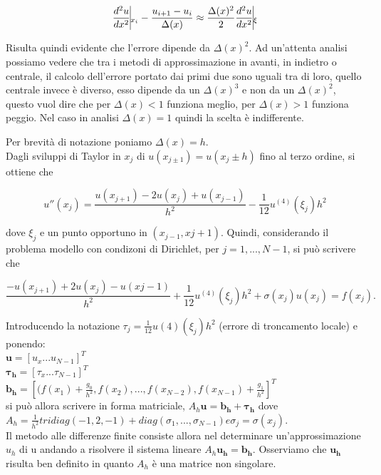 $$
\frac{d^2u}{dx^2}\vline_{x_i}-\frac{u_{i+1}-u_i}{\Delta(x)}\approx \frac{\Delta(x)^2}{2} \frac{d^2u}{dx^2}\vline_\xi
$$

Risulta quindi evidente che l'errore dipende da $\Delta(x)^2$. 
Ad un'attenta analisi possiamo vedere che tra i metodi di approssimazione in avanti, in indietro o centrale, il calcolo dell'errore portato dai primi due sono uguali tra di loro, quello centrale invece è diverso, esso dipende da un $\Delta(x)^3$ e non da un $\Delta(x)^2$, questo vuol dire che per $\Delta(x)<1$ funziona meglio, per $\Delta(x)>1$ funziona peggio. Nel caso in analisi $\Delta(x)=1$ quindi la scelta è indifferente.

Per brevità di notazione poniamo $\Delta(x)=h$.\\
Dagli sviluppi di Taylor in $x_j$ di
$u(x_{j \pm 1}) = u(x_j \pm h)$ fino al terzo ordine, si ottiene che

$$
u''(x_j) =\frac{u(x_{j+1}) - 2u(x_j) + u(x_{j-1})}{h^2} -\frac{1}{12} u^{(4)}(\xi_j)h^2
$$

dove $\xi_j$ e un punto opportuno in $(x_{j-1} , x{j+1})$. Quindi, considerando il problema modello con condizoni di Dirichlet, per $j = 1,...,N-1$, si può scrivere che

$$
\frac{-u(x_{j+1}) + 2u(x_j) -u(x{j-1})}{h^2}
 + \frac{1}{12} u^{(4)}(\xi_j)h^2 + \sigma(x_j)u(x_j) = f(x_j) .
$$

Introducendo la notazione $\tau_{j}=\frac{1}{12} u(4)(\xi_j)h^2$ (errore di troncamento locale) e ponendo:\\

$\boldsymbol{u}=[u_x...u_{N-1}]^T$\\
$\boldsymbol{\tau_h}=[\tau_x...\tau_{N-1}]^T$\\
$\boldsymbol{b_h}=[(f(x_1) + \frac{g_0}{h^2},f(x_2),...,f(x_{N-2}),f(x_{N-1}) + \frac{g_1}{h^2}]^T$\\

si può allora scrivere in forma matriciale,
$A_h\boldsymbol{u} = \boldsymbol{b_h} + \boldsymbol{\tau_h}$
dove $A_h = \frac{1}{h^2}
 tridiag(-1,2,-1) + diag(\sigma_1, ... ,\sigma_{N-1}) e \sigma_j = \sigma(x_j)$.\\
\vspace{1em}
Il metodo alle differenze finite consiste allora nel determinare un’approssimazione $u_h$ di
u andando a risolvere il sistema lineare
$A_h\boldsymbol{u_h} = \boldsymbol{b_h}.$
Osserviamo che $\boldsymbol{u_h}$ risulta ben definito in quanto $A_h$ è una matrice non singolare.\\

